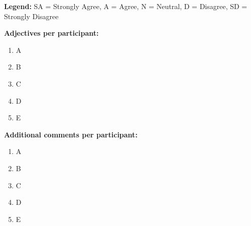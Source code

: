 \documentclass[11pt]{article}
\begin{document}
	\textbf{Legend:} SA = Strongly Agree, A = Agree, N = Neutral, D = Disagree, SD = Strongly Disagree
	
	\vspace{0.5cm}
	
	\textbf{Adjectives per participant:}
	\begin{enumerate}
		\item A
		\item B
		\item C
		\item D
		\item E
	\end{enumerate}
	
	\vspace{0.25cm}
	
	\textbf{Additional comments per participant:}
	\begin{enumerate}
		\item A
		\item B
		\item C
		\item D
		\item E
	\end{enumerate}
	
\end{document}
